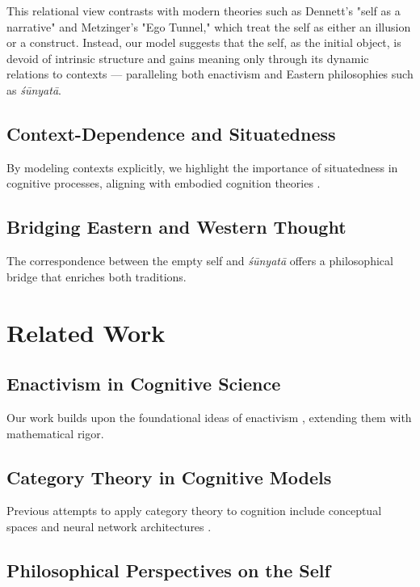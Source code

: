 \documentclass{article}
\begin{document}
This relational view contrasts with modern theories such as Dennett's "self as a narrative" and Metzinger's "Ego Tunnel," which treat the self as either an illusion or a construct. Instead, our model suggests that the self, as the initial object, is devoid of intrinsic structure and gains meaning only through its dynamic relations to contexts --- paralleling both enactivism and Eastern philosophies such as \emph{śūnyatā}.


\subsection{Context-Dependence and Situatedness}
By modeling contexts explicitly, we highlight the importance of situatedness in cognitive processes, aligning with embodied cognition theories \cite{clark1997}.

\subsection{Bridging Eastern and Western Thought}

The correspondence between the empty self and \emph{śūnyatā} offers a philosophical bridge that enriches both traditions.

\section{Related Work}

\subsection{Enactivism in Cognitive Science}

Our work builds upon the foundational ideas of enactivism \cite{varela1991}, extending them with mathematical rigor.

\subsection{Category Theory in Cognitive Models}

Previous attempts to apply category theory to cognition include conceptual spaces \cite{gardenfors2004} and neural network architectures \cite{spivak2014}.

\subsection{Philosophical Perspectives on the Self}
\end{document}
